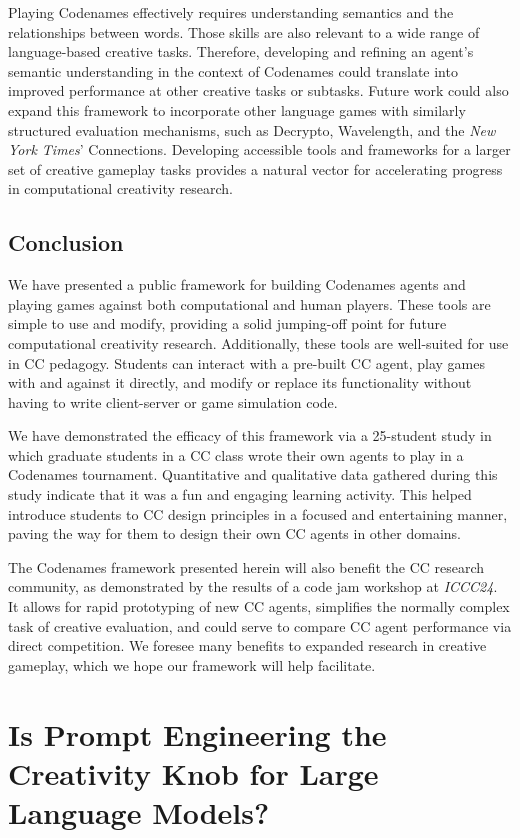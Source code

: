 \documentclass[phd,electronic,oneside,twosidetoc,letterpaper,chaptercenter,parttop,lof]{byumsphd}
\begin{document}
Playing Codenames effectively requires understanding semantics and the relationships between words. Those skills are also relevant to a wide range of language-based creative tasks. Therefore, developing and refining an agent's semantic understanding in the context of Codenames could translate into improved performance at other creative tasks or subtasks. Future work could also expand this framework to incorporate other language games with similarly structured evaluation mechanisms, such as Decrypto, Wavelength, and the \emph{New York Times}' Connections. Developing accessible tools and frameworks for a larger set of creative gameplay tasks provides a natural vector for accelerating progress in computational creativity research.

\section{Conclusion}
We have presented a public framework for building Codenames agents and playing games against both computational and human players. These tools are simple to use and modify, providing a solid jumping-off point for future computational creativity research. Additionally, these tools are well-suited for use in CC pedagogy. Students can interact with a pre-built CC agent, play games with and against it directly, and modify or replace its functionality without having to write client-server or game simulation code.

We have demonstrated the efficacy of this framework via a 25-student study in which graduate students in a CC class wrote their own agents to play in a Codenames tournament. Quantitative and qualitative data gathered during this study indicate that it was a fun and engaging learning activity. This helped introduce students to CC design principles in a focused and entertaining manner, paving the way for them to design their own CC agents in other domains.

The Codenames framework presented herein will also benefit the CC research community, as demonstrated by the results of a code jam workshop at \emph{ICCC24}. It allows for rapid prototyping of new CC agents, simplifies the normally complex task of creative evaluation, and could serve to compare CC agent performance via direct competition. We foresee many benefits to expanded research in creative gameplay, which we hope our framework will help facilitate.

\chapter{Is Prompt Engineering the Creativity Knob for Large Language Models?}
\label{chap:cc_prompting}
\end{document}
